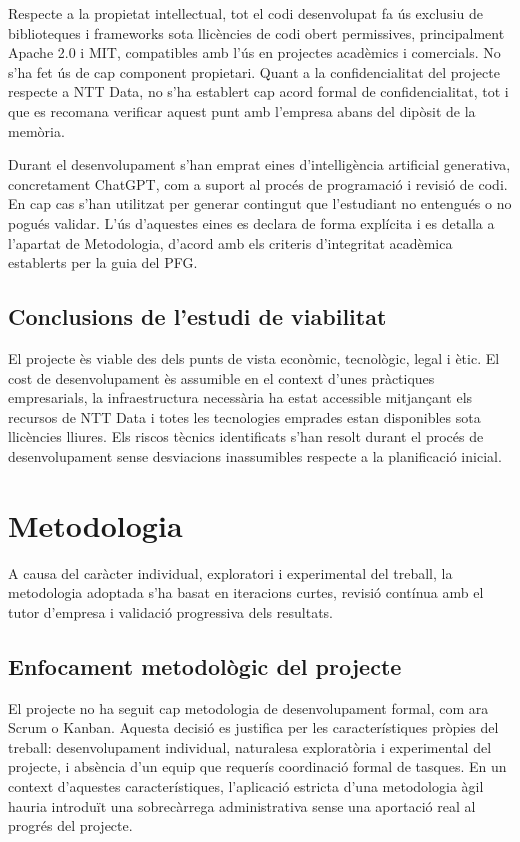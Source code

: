 \documentclass[11pt,a4paper]{article}
\newcommand{\sectionintro}[1]{%
  \vspace{0.25em}%
  #1\par
}
\begin{document}
Respecte a la propietat intel\textperiodcentered lectual, tot el codi desenvolupat fa \'us exclusiu de biblioteques i frameworks sota llic\`encies de codi obert permissives, principalment Apache 2.0 i MIT, compatibles amb l'\'us en projectes acad\`emics i comercials. No s'ha fet \'us de cap component propietari. Quant a la confidencialitat del projecte respecte a NTT Data, no s'ha establert cap acord formal de confidencialitat, tot i que es recomana verificar aquest punt amb l'empresa abans del dip\`osit de la mem\`oria.

Durant el desenvolupament s'han emprat eines d'intel\textperiodcentered lig\`encia artificial generativa, concretament ChatGPT, com a suport al proc\'es de programaci\'o i revisi\'o de codi. En cap cas s'han utilitzat per generar contingut que l'estudiant no entengu\'es o no pogu\'es validar. L'\'us d'aquestes eines es declara de forma expl\'icita i es detalla a l'apartat de Metodologia, d'acord amb els criteris d'integritat acad\`emica establerts per la guia del PFG.

\subsection{Conclusions de l'estudi de viabilitat}
El projecte \`es viable des dels punts de vista econ\`omic, tecnol\`ogic, legal i \`etic. El cost de desenvolupament \`es assumible en el context d'unes pr\`actiques empresarials, la infraestructura necess\`aria ha estat accessible mitjan\c{c}ant els recursos de NTT Data i totes les tecnologies emprades estan disponibles sota llic\`encies lliures. Els riscos t\`ecnics identificats s'han resolt durant el proc\'es de desenvolupament sense desviacions inassumibles respecte a la planificaci\'o inicial.

\section{Metodologia}
\sectionintro{A causa del car\`acter individual, exploratori i experimental del treball, la metodologia adoptada s'ha basat en iteracions curtes, revisi\'o cont\'inua amb el tutor d'empresa i validaci\'o progressiva dels resultats.}

\subsection{Enfocament metodol\`ogic del projecte}
El projecte no ha seguit cap metodologia de desenvolupament formal, com ara Scrum o Kanban. Aquesta decisi\'o es justifica per les caracter\'istiques pr\`opies del treball: desenvolupament individual, naturalesa explorat\`oria i experimental del projecte, i abs\`encia d'un equip que requer\'is coordinaci\'o formal de tasques. En un context d'aquestes caracter\'istiques, l'aplicaci\'o estricta d'una metodologia \`agil hauria introdu\"it una sobrec\`arrega administrativa sense una aportaci\'o real al progr\'es del projecte.
\end{document}
